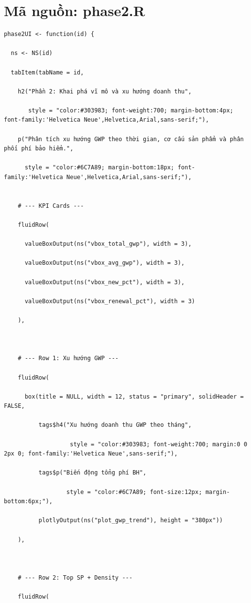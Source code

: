 \documentclass[12pt, a4paper]{article}
\begin{document}
\section{Mã nguồn: phase2.R}
\begin{lstlisting}
phase2UI <- function(id) {

  ns <- NS(id)

  tabItem(tabName = id,

    h2("Phần 2: Khai phá vĩ mô và xu hướng doanh thu",

       style = "color:#303983; font-weight:700; margin-bottom:4px; font-family:'Helvetica Neue',Helvetica,Arial,sans-serif;"),

    p("Phân tích xu hướng GWP theo thời gian, cơ cấu sản phẩm và phân phối phí bảo hiểm.",

      style = "color:#6C7A89; margin-bottom:18px; font-family:'Helvetica Neue',Helvetica,Arial,sans-serif;"),


    # --- KPI Cards ---

    fluidRow(

      valueBoxOutput(ns("vbox_total_gwp"), width = 3),

      valueBoxOutput(ns("vbox_avg_gwp"), width = 3),

      valueBoxOutput(ns("vbox_new_pct"), width = 3),

      valueBoxOutput(ns("vbox_renewal_pct"), width = 3)

    ),



    # --- Row 1: Xu hướng GWP ---

    fluidRow(

      box(title = NULL, width = 12, status = "primary", solidHeader = FALSE,

          tags$h4("Xu hướng doanh thu GWP theo tháng",

                   style = "color:#303983; font-weight:700; margin:0 0 2px 0; font-family:'Helvetica Neue',sans-serif;"),

          tags$p("Biến động tổng phí BH",

                  style = "color:#6C7A89; font-size:12px; margin-bottom:6px;"),

          plotlyOutput(ns("plot_gwp_trend"), height = "380px"))

    ),



    # --- Row 2: Top SP + Density ---

    fluidRow(


\end{lstlisting}
\end{document}
